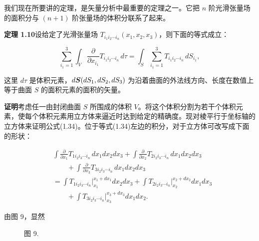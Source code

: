 我们现在所要讲的定理，是矢量分析中最重要的定理之一。它把 $n$ 阶光滑张量场的面积分与 $(n + 1)$ 阶张量场的体积分联系了起来。

\textbf{定理 1.10}\quad 设给定了光滑张量场 $T_{i_1 i_2 \cdots i_n}(x_1, x_2, x_3)$，则下面的等式成立：

\begin{equation}
\sum_{i_1 = 1}^{3} \int_{V} \frac{\partial}{\partial x_{i_1}} T_{i_1 i_2 \cdots i_n}\, d\tau
= \int_{S} \sum_{i_1 = 1}^{3} T_{i_1 i_2 \cdots i_n}\, dS_{i_1},
\tag{1.34}
\end{equation}

这里 $d\tau$ 是体积元素，$d\bm{S}(dS_1, dS_2, dS_3)$ 为沿着曲面的外法线方向、长度在数值上等于曲面 $S$ 的面积元素的面积的矢量。

\textbf{证明}\quad 考虑任一由封闭曲面 $S$ 所围成的体积 $V$。将这个体积分割为若干个体积元素，使每个体积元素用立方体来逼近时达到给定的精确度。现对棱平行于坐标轴的立方体来证明公式(1.34)。位于等式(1.34)左边的积分，对于立方体可改写成下面的形状：

\begin{equation}
\begin{aligned}
&\int \frac{\partial}{\partial x_1} T_{1 i_2 i_3 \cdots i_n}\, dx_1 dx_2 dx_3
 + \int \frac{\partial}{\partial x_2} T_{2 i_2 i_3 \cdots i_n}\, dx_1 dx_2 dx_3\\
&\qquad + \int \frac{\partial}{\partial x_3} T_{3 i_2 i_3 \cdots i_n}\, dx_1 dx_2 dx_3\\
&= \int T_{1 i_2 i_3 \cdots i_n} \Big|_{x_1}^{x_1 + dx_1} dx_2 dx_3
 + \int T_{2 i_2 i_3 \cdots i_n} \Big|_{x_2}^{x_2 + dx_2} dx_1 dx_3\\
&\qquad + \int T_{3 i_2 i_3 \cdots i_n} \Big|_{x_3}^{x_3 + dx_3} dx_1 dx_2.
\end{aligned}
\tag{1.35}
\end{equation}

由图 9，显然

\begin{figure}[htbp]
\centering
{}
\par\vspace{2pt}
{\small 图 9.}
\end{figure}

